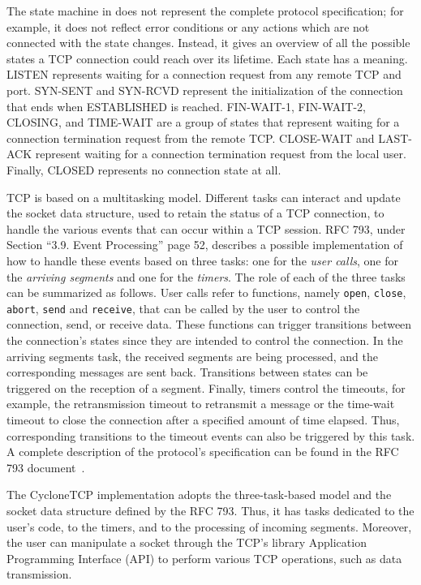 \documentclass[conference]{IEEEtran}
\def\state#1{\textsf{\MakeUppercase{#1}}\xspace}
\def\sclosed{\state{closed}}
\def\ssynsent{\state{syn-sent}}
\def\ssynrcv{\state{syn-rcvd}}
\def\slisten{\state{listen}}
\def\sestab{\state{established}}
\def\sfwone{\state{fin-wait-1}}
\def\sfwtwo{\state{fin-wait-2}}
\def\sclosing{\state{closing}}
\def\sclosew{\state{close-wait}}
\def\slastack{\state{last-ack}}
\def\stimewait{\state{time-wait}}
\begin{document}
The state machine in  does not represent the complete protocol specification; for example, it does not reflect error conditions or any actions which are not connected with the state changes. Instead, it gives an overview of all the possible states a TCP connection could reach over its lifetime. Each state has a meaning. \slisten represents waiting for a connection request from any remote TCP and port. \ssynsent and \ssynrcv represent the initialization of the connection that ends when \sestab is reached. \sfwone, \sfwtwo, \sclosing, and \stimewait are a group of states that represent waiting for a connection termination request from the remote TCP. \sclosew and \slastack represent waiting for a connection termination request from the local user. Finally, \sclosed represents no connection state at all.


TCP is based on a multitasking model. Different tasks can interact and update the socket data structure, used to retain the status of a TCP connection, to handle the various events that can occur within a TCP session. RFC 793, under Section ``3.9. Event Processing'' page 52, describes a possible implementation of how to handle these events based on three tasks: one for the \emph{user calls}, one for the \emph{arriving segments} and one for the \emph{timers}. The role of each of the three tasks can be summarized as follows. User calls refer to functions, namely \texttt{open}, \texttt{close}, \texttt{abort}, \texttt{send} and \texttt{receive}, that can be called by the user to control the connection, send, or receive data. These functions can trigger transitions between the connection's states since they are intended to control the connection. In the arriving segments task, the received segments are being processed,
and the corresponding messages are sent back. Transitions between states can be triggered on the reception of a segment. Finally, timers control the timeouts, for example, the retransmission timeout to retransmit a message or the time-wait timeout to close the connection after a specified amount of time elapsed. Thus, corresponding transitions to the timeout events can also be triggered by this task. A complete description of the protocol's specification can be found in the RFC 793 document~\cite{rfc793}.

The CycloneTCP implementation adopts the three-task-based model and the socket data structure defined by the RFC 793. Thus, it has tasks dedicated to the user's code, to the timers, and to the processing of incoming segments. Moreover, the user can manipulate a socket through the TCP's library Application Programming Interface (API) to perform various TCP operations, such as data transmission.
\end{document}
